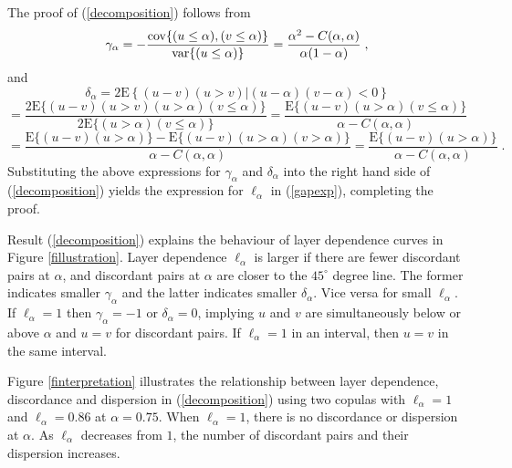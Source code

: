 \documentclass[authoryear]{elsarticle}
\newcommand{\var}{{\rm var}}
\newcommand{\cov}{{\rm cov}}
\newcommand{\E}{{\mathrm E}}
\newcommand{\eref}[1]{(\ref{#1})}
\newcommand{\fref}[1]{Figure \ref{#1}}
\begin{document}
The proof of \eref{decomposition} follows from
$$
\gamma_\alpha
=-\frac{\cov\{(u\leq\alpha),(v\leq\alpha)\}}{\var\{(u\leq\alpha)\}}
=\frac{\alpha^2-C(\alpha,\alpha)}{\alpha(1-\alpha)}   \;,
$$
and
$$
\delta_\alpha = 2 \E\left\{(u-v)(u>v)|(u-\alpha)(v-\alpha)<0\right\}
$$
$$
=  \frac{2\E\{(u-v)(u>v)(u>\alpha)(v\leq\alpha)\}}{2\E\{(u>\alpha)(v\leq\alpha)\}}
= \frac{\E\{(u-v)(u>\alpha)(v\leq\alpha)\}}{\alpha-C(\alpha,\alpha)}
$$
$$
= \frac{\E\{(u-v)(u>\alpha)\}-\E\{(u-v)(u>\alpha)(v>\alpha)\}}{\alpha-C(\alpha,\alpha)}
 = \frac{\E\{(u-v)(u>\alpha)\}}{\alpha-C(\alpha,\alpha)} \;.
$$
Substituting the above expressions for $\gamma_\alpha$ and $\delta_\alpha$ into the right hand side of \eref{decomposition} yields the expression for $\ell_\alpha$ in \eref{gapexp}, completing the proof.

Result \eref{decomposition} explains the behaviour of layer dependence curves in \fref{fillustration}. Layer dependence $\ell_\alpha$ is larger if there are fewer discordant pairs at $\alpha$, and discordant pairs at $\alpha$ are closer to the $45^\circ$ degree line. The former indicates smaller $\gamma_\alpha$ and the latter indicates smaller $\delta_\alpha$. Vice versa for small $\ell_\alpha$. If $\ell_\alpha=1$ then $\gamma_\alpha=-1$ or $\delta_\alpha=0$, implying $u$ and $v$ are simultaneously below or above $\alpha$ and $u=v$ for discordant pairs. If $\ell_\alpha=1$  in an interval, then $u=v$  in the same interval.

\fref{finterpretation} illustrates the relationship between layer dependence, discordance and dispersion in \eref{decomposition} using two copulas with $\ell_\alpha=1$ and $\ell_\alpha=0.86$ at $\alpha=0.75$. When $\ell_\alpha=1$, there is no discordance or dispersion at $\alpha$. As $\ell_\alpha$ decreases from $1$, the number of discordant pairs and their dispersion increases.
\end{document}

